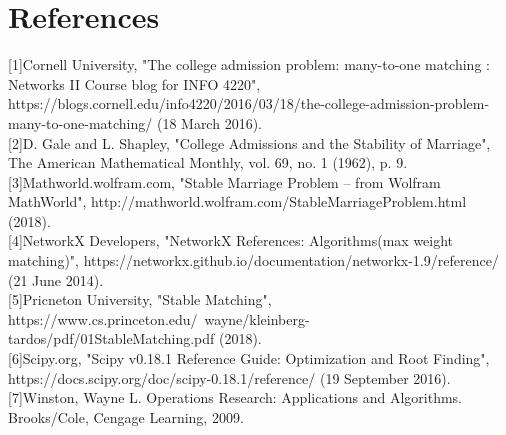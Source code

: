 \documentclass[twoside,twocolumn]{article}
\begin{document}
    \section{References}
    [1]Cornell University, "The college admission problem: many-to-one matching : Networks II Course blog for INFO 4220", https://blogs.cornell.edu/info4220/2016/03/18/the-college-admission-problem-many-to-one-matching/ (18 March 2016).\\

    [2]D. Gale and L. Shapley, "College Admissions and the Stability of Marriage", The American Mathematical Monthly, vol. 69, no. 1 (1962), p. 9. \\
    
    [3]Mathworld.wolfram.com, "Stable Marriage Problem -- from Wolfram MathWorld", http://mathworld.wolfram.com/StableMarriageProblem.html (2018). \\

    [4]NetworkX Developers, "NetworkX References: Algorithms(max weight matching)", https://networkx.github.io/documentation/networkx-1.9/reference/ (21 June 2014). \\

    [5]Pricneton University, "Stable Matching", https://www.cs.princeton.edu/~wayne/kleinberg-tardos/pdf/01StableMatching.pdf (2018). \\

    [6]Scipy.org, "Scipy v0.18.1 Reference Guide: Optimization and Root Finding", https://docs.scipy.org/doc/scipy-0.18.1/reference/ (19 September 2016).\\

    [7]Winston, Wayne L. Operations Research: Applications and Algorithms. Brooks/Cole, Cengage Learning, 2009.
\end{document}
